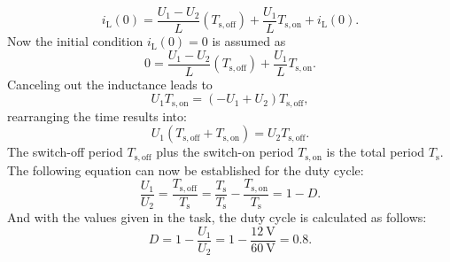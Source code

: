 \begin{solutionblock}
    \begin{equation}
        i_{\mathrm{L}}(0) = \frac{U_{\mathrm{1}}-U_{\mathrm{2}} }{L} (T_{\mathrm{s,off}})+\frac{U_{\mathrm{1}}}{L}T_{\mathrm{s,on}}+i_{\mathrm{L}}(0).
    \end{equation}
    Now the initial condition $i_{\mathrm{L}}(0)=0$ is assumed as 
    \begin{equation}
        0 = \frac{U_{\mathrm{1}}-U_{\mathrm{2}} }{L} (T_{\mathrm{s,off}})+\frac{U_{\mathrm{1}}}{L}T_{\mathrm{s,on}}.
    \end{equation}
    Canceling out the inductance leads to
    \begin{equation}
        U_{\mathrm{1}}T_{\mathrm{s,on}}= (-U_{\mathrm{1}}+U_{\mathrm{2}})T_{\mathrm{s,off}},
    \end{equation}
    rearranging the time results into:
    \begin{equation}
        U_{\mathrm{1}}(T_{\mathrm{s,off}}+T_{\mathrm{s,on}})=  U_{\mathrm{2}}T_{\mathrm{s,off}}.
    \end{equation}
    The switch-off period $T_{\mathrm{s,off}}$ plus the switch-on period $T_{\mathrm{s,on}}$ is the total period $T_{\mathrm{s}}$. The following equation can now be established for the duty cycle:
    \begin{equation}
        \frac{U_{\mathrm{1}}}{U_{\mathrm{2}}}= \frac{T_{\mathrm{s,off}}}{T_{\mathrm{s}}}= \frac{T_{\mathrm{s}}}{T_{\mathrm{s}}}-\frac{T_{\mathrm{s,on}}}{T_{\mathrm{s}}} = 1-D.
    \end{equation}
    And with the values given in the task, the duty cycle is calculated as follows:
    \begin{equation}
        D = 1-\frac{U_{\mathrm{1}}}{U_{\mathrm{2}}} = 1- \frac {\SI{12}{\volt}} {\SI{60}{\volt}} = 0.8.
    \end{equation}
\end{solutionblock}


